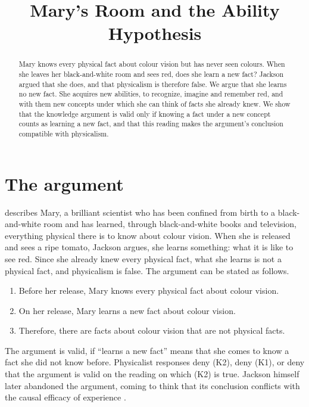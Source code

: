 \documentclass{situationist-preprint}
\title{Mary's Room and the Ability Hypothesis}
\begin{document}
\maketitle

\begin{abstract}
Mary knows every physical fact about colour vision but has never seen colours. When she leaves her black-and-white room and sees red, does she learn a new fact? Jackson argued that she does, and that physicalism is therefore false. We argue that she learns no new fact. She acquires new abilities, to recognize, imagine and remember red, and with them new concepts under which she can think of facts she already knew. We show that the knowledge argument is valid only if knowing a fact under a new concept counts as learning a new fact, and that this reading makes the argument's conclusion compatible with physicalism.
\end{abstract}

\section{The argument}

\citet{Jackson1982} describes Mary, a brilliant scientist who has been confined from birth to a black-and-white room and has learned, through black-and-white books and television, everything physical there is to know about colour vision. When she is released and sees a ripe tomato, Jackson argues, she learns something: what it is like to see red. Since she already knew every physical fact, what she learns is not a physical fact, and physicalism is false. The argument can be stated as follows.
\begin{enumerate}[label=(K\arabic*)]
\item Before her release, Mary knows every physical fact about colour vision.
\item On her release, Mary learns a new fact about colour vision.
\item Therefore, there are facts about colour vision that are not physical facts.
\end{enumerate}
The argument is valid, if \enquote{learns a new fact} means that she comes to know a fact she did not know before. Physicalist responses deny (K2), deny (K1), or deny that the argument is valid on the reading on which (K2) is true. Jackson himself later abandoned the argument, coming to think that its conclusion conflicts with the causal efficacy of experience \citep{Jackson1998}.
\end{document}
